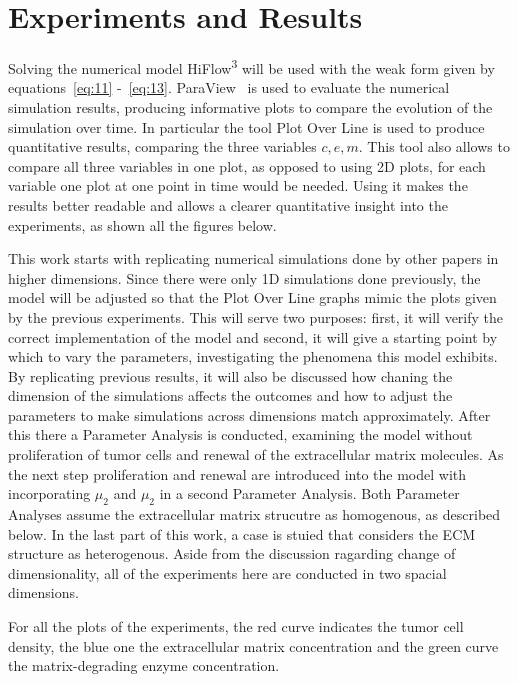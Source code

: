 

\section{Experiments and Results}
\label{sec:experiments}

Solving the numerical model HiFlow\textsuperscript{3}\cite{BibEntry2024Apr} will be used with the weak form given by equations~\ref{eq:11} -~\ref{eq:13}. ParaView~\cite{paraview} is used to evaluate the numerical simulation results, producing informative plots to compare the evolution of the simulation over time. In particular the tool Plot Over Line is used to produce quantitative results, comparing the three variables $c,e,m$. This tool also allows to compare all three variables in one plot, as opposed to using 2D plots, for each variable one plot at one point in time would be needed. Using it makes the results better readable and allows a clearer quantitative insight into the experiments, as shown all the figures below.

This work starts with replicating numerical simulations done by other papers in higher dimensions. Since there were only 1D simulations done previously, the model will be adjusted so that the Plot Over Line graphs mimic the plots given by the previous experiments. This will serve two purposes: first, it will verify the correct implementation of the model and second, it will give a starting point by which to vary the parameters, investigating the phenomena this model exhibits. By replicating previous results, it will also be discussed how chaning the dimension of the simulations affects the outcomes and how to adjust the parameters to make simulations across dimensions match approximately. After this there a Parameter Analysis is conducted, examining the model without proliferation of tumor cells and renewal of the extracellular matrix molecules. As the next step proliferation and renewal are introduced into the model with incorporating $\mu_2$ and $\mu_2$ in a second Parameter Analysis. Both Parameter Analyses assume the extracellular matrix strucutre as homogenous, as described below. In the last part of this work, a case is stuied that considers the ECM structure as heterogenous. Aside from the discussion ragarding change of dimensionality, all of the experiments here are conducted in two spacial dimensions.

For all the plots of the experiments, the red curve indicates the tumor cell density, the blue one the extracellular matrix concentration and the green curve the matrix-degrading enzyme concentration.

